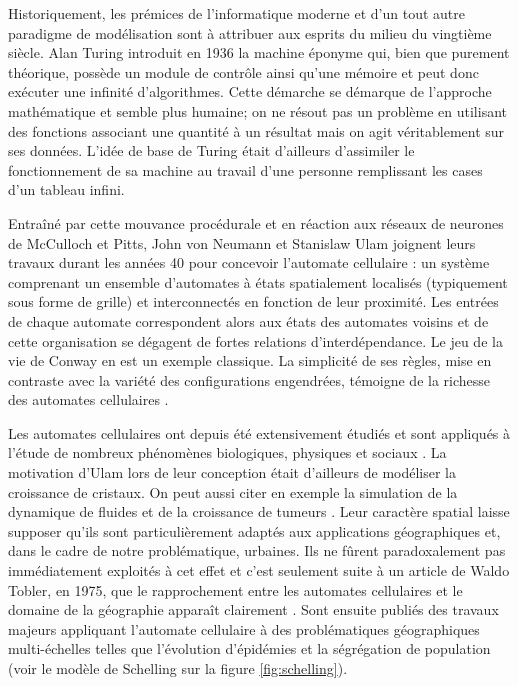 \documentclass[12pt]{article}
\begin{document}
Historiquement, les prémices de l'informatique moderne et d'un tout
autre paradigme de modélisation sont à attribuer aux esprits du milieu
du vingtième siècle. Alan Turing introduit en 1936 la machine éponyme
qui, bien que purement théorique, possède un module de contrôle ainsi
qu'une mémoire et peut donc exécuter une infinité d'algorithmes. Cette
démarche se démarque de l'approche mathématique et semble plus
humaine; on ne résout pas un problème en utilisant des fonctions
associant une quantité à un résultat mais on agit véritablement sur
ses données. L'idée de base de Turing était d'ailleurs d'assimiler le
fonctionnement de sa machine au travail d'une personne remplissant les
cases d'un tableau infini.

Entraîné par cette mouvance procédurale et en réaction aux réseaux de
neurones de McCulloch et Pitts, John von Neumann et Stanislaw Ulam
joignent leurs travaux durant les années 40 pour concevoir l'automate
cellulaire : un système comprenant un ensemble d'automates à états
spatialement localisés (typiquement sous forme de grille) et
interconnectés en fonction de leur proximité. Les entrées de chaque
automate correspondent alors aux états des automates voisins et de
cette organisation se dégagent de fortes relations
d'interdépendance. Le jeu de la vie de Conway en est un exemple
classique. La simplicité de ses règles, mise en contraste avec la
variété des configurations engendrées, témoigne de la richesse des
automates cellulaires \cite{Gardner1970}.

Les automates cellulaires ont depuis été extensivement étudiés et sont
appliqués à l'étude de nombreux phénomènes biologiques, physiques et
sociaux \cite{Ganguly2003}. La motivation d'Ulam lors de leur
conception était d'ailleurs de modéliser la croissance de cristaux. On
peut aussi citer en exemple la simulation de la dynamique de fluides
\cite{Frisch1986} et de la croissance de tumeurs
\cite{Kansal2000}. Leur caractère spatial laisse supposer qu'ils sont
particulièrement adaptés aux applications géographiques et, dans le
cadre de notre problématique, urbaines. Ils ne fûrent paradoxalement
pas immédiatement exploités à cet effet et c'est seulement suite à un
article de Waldo Tobler, en 1975, que le rapprochement entre les
automates cellulaires et le domaine de la géographie apparaît
clairement \cite{Tobler1975}. Sont ensuite publiés des travaux majeurs
appliquant l'automate cellulaire à des problématiques géographiques
multi-échelles telles que l'évolution d'épidémies \cite{Fu2003} et la
ségrégation de population \cite{Schelling1969} (voir le modèle de
Schelling sur la figure \ref{fig:schelling}).
\end{document}
